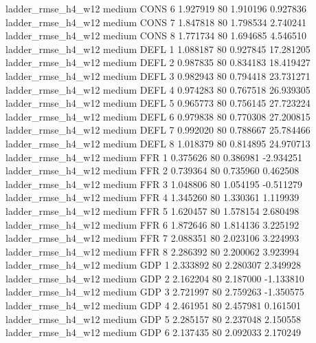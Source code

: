  ladder_rmse_h4_w12     medium     CONS                 6  1.927919 80       1.910196           0.927836
 ladder_rmse_h4_w12     medium     CONS                 7  1.847818 80       1.798534           2.740241
 ladder_rmse_h4_w12     medium     CONS                 8  1.771734 80       1.694685           4.546510
 ladder_rmse_h4_w12     medium     DEFL                 1  1.088187 80       0.927845          17.281205
 ladder_rmse_h4_w12     medium     DEFL                 2  0.987835 80       0.834183          18.419427
 ladder_rmse_h4_w12     medium     DEFL                 3  0.982943 80       0.794418          23.731271
 ladder_rmse_h4_w12     medium     DEFL                 4  0.974283 80       0.767518          26.939305
 ladder_rmse_h4_w12     medium     DEFL                 5  0.965773 80       0.756145          27.723224
 ladder_rmse_h4_w12     medium     DEFL                 6  0.979838 80       0.770308          27.200815
 ladder_rmse_h4_w12     medium     DEFL                 7  0.992020 80       0.788667          25.784466
 ladder_rmse_h4_w12     medium     DEFL                 8  1.018379 80       0.814895          24.970713
 ladder_rmse_h4_w12     medium      FFR                 1  0.375626 80       0.386981          -2.934251
 ladder_rmse_h4_w12     medium      FFR                 2  0.739364 80       0.735960           0.462508
 ladder_rmse_h4_w12     medium      FFR                 3  1.048806 80       1.054195          -0.511279
 ladder_rmse_h4_w12     medium      FFR                 4  1.345260 80       1.330361           1.119939
 ladder_rmse_h4_w12     medium      FFR                 5  1.620457 80       1.578154           2.680498
 ladder_rmse_h4_w12     medium      FFR                 6  1.872646 80       1.814136           3.225192
 ladder_rmse_h4_w12     medium      FFR                 7  2.088351 80       2.023106           3.224993
 ladder_rmse_h4_w12     medium      FFR                 8  2.286392 80       2.200062           3.923994
 ladder_rmse_h4_w12     medium      GDP                 1  2.333892 80       2.280307           2.349928
 ladder_rmse_h4_w12     medium      GDP                 2  2.162204 80       2.187000          -1.133810
 ladder_rmse_h4_w12     medium      GDP                 3  2.721997 80       2.759263          -1.350575
 ladder_rmse_h4_w12     medium      GDP                 4  2.461951 80       2.457981           0.161501
 ladder_rmse_h4_w12     medium      GDP                 5  2.285157 80       2.237048           2.150558
 ladder_rmse_h4_w12     medium      GDP                 6  2.137435 80       2.092033           2.170249
